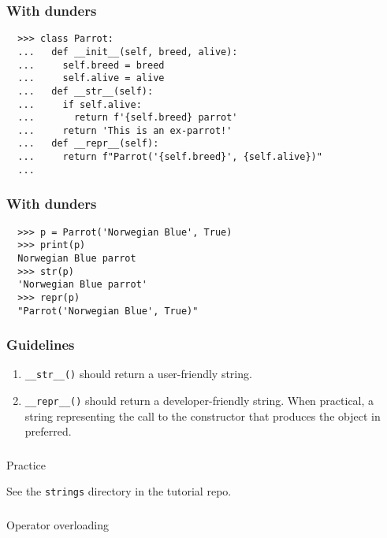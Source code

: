 \documentclass[aspectratio=169]{beamer}
\begin{document}
\begin{frame}[fragile]
  \frametitle{With dunders}
  
  \begin{Verbatim}
  >>> class Parrot:
  ...   def __init__(self, breed, alive):
  ...     self.breed = breed
  ...     self.alive = alive
  ...   def __str__(self):
  ...     if self.alive:
  ...       return f'{self.breed} parrot'
  ...     return 'This is an ex-parrot!'
  ...   def __repr__(self):
  ...     return f"Parrot('{self.breed}', {self.alive})"
  ...
    \end{Verbatim}
 \end{frame}
  
  
\begin{frame}[fragile]
  \frametitle{With dunders}
  
  \begin{Verbatim}
  >>> p = Parrot('Norwegian Blue', True)
  >>> print(p)
  Norwegian Blue parrot
  >>> str(p)
  'Norwegian Blue parrot'
  >>> repr(p)
  "Parrot('Norwegian Blue', True)"  
  \end{Verbatim}
 \end{frame}
  
\begin{frame}
  \frametitle{Guidelines} 
  
   
   
   \begin{enumerate}
     \item \texttt{\_\_str\_\_()} should return a user-friendly string.
     \item \texttt{\_\_repr\_\_()} should return a developer-friendly string. When practical, a string representing the call to the constructor that produces the object in preferred.
   \end{enumerate}  
 \end{frame}
  
\begin{frame}
  \frametitle{} 
   
   \centerline{\huge Practice} 
   \centerline{See the \texttt{strings} directory in the tutorial repo.} 
   
   \end{frame}

\begin{frame}
  \frametitle{} 
  \centerline{\huge Operator overloading}
 \end{frame}
 
\end{document}
